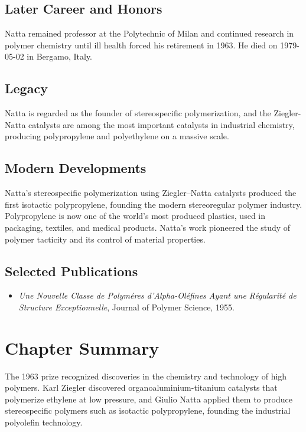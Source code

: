 \subsection*{Later Career and Honors}

Natta remained professor at the Polytechnic of Milan and continued research in polymer chemistry until ill health forced his retirement in 1963. He died on 1979-05-02 in Bergamo, Italy.

\subsection*{Legacy}

Natta is regarded as the founder of stereospecific polymerization, and the Ziegler-Natta catalysts are among the most important catalysts in industrial chemistry, producing polypropylene and polyethylene on a massive scale.

\subsection*{Modern Developments}

Natta's stereospecific polymerization using Ziegler–Natta catalysts produced the first isotactic polypropylene, founding the modern stereoregular polymer industry. Polypropylene is now one of the world's most produced plastics, used in packaging, textiles, and medical products. Natta's work pioneered the study of polymer tacticity and its control of material properties.

\subsection*{Selected Publications}

\begin{itemize}

\item \emph{Une Nouvelle Classe de Polym{\'e}res d'Alpha-Ol{\'e}fines Ayant une R{\'e}gularit{\'e} de Structure Exceptionnelle}, Journal of Polymer Science, 1955.

\end{itemize}

\clearpage

\section*{Chapter Summary}

The 1963 prize recognized discoveries in the chemistry and technology of high polymers. Karl Ziegler discovered organoaluminium-titanium catalysts that polymerize ethylene at low pressure, and Giulio Natta applied them to produce stereospecific polymers such as isotactic polypropylene, founding the industrial polyolefin technology.

